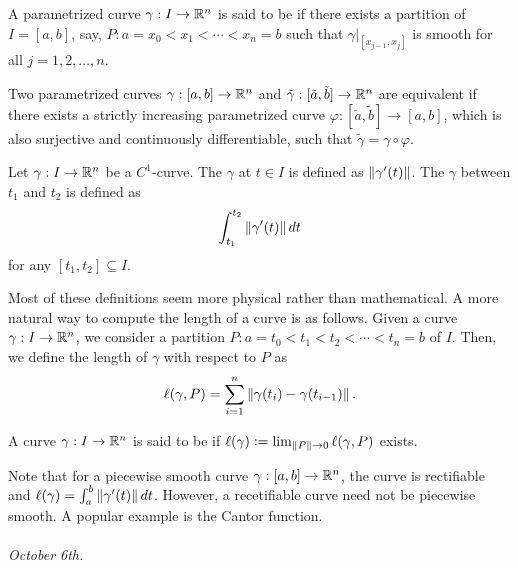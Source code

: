 \begin{definition}
    A parametrized curve $\gamma:I \to \mathbb{R}^{n}$ is said to be  if there exists a partition of $I = [a,b]$, say, $P:a = x_{0}<x_{1}<\cdots<x_{n}=b$ such that $\gamma|_{[x_{j-1},x_{j}]}$ is smooth for all $j = 1,2,\ldots,n$.
\end{definition}

\begin{definition}
    Two parametrized curves $\gamma:[a,b] \to \mathbb{R}^{n}$ and $\tilde{\gamma}:[\tilde{a},\tilde{b}] \to \mathbb{R}^{n}$ are equivalent if there exists a strictly increasing parametrized curve $\varphi:[\tilde{a},\tilde{b}] \to [a,b]$, which is also surjective and continuously differentiable, such that $\tilde{\gamma} = \gamma \circ \varphi$.
\end{definition}

\begin{definition}
    Let $\gamma:I \to \mathbb{R}^{n}$ be a $C^{1}$-curve. The  $\gamma$ at $t \in I$ is defined as $\left\lVert\gamma'(t)\right\rVert$. The  $\gamma$ between $t_{1}$ and $t_{2}$ is defined as
    \begin{align}
        \int_{t_{1}}^{t_{2}} \left\lVert\gamma'(t)\right\rVert dt
    \end{align}
    for any $[t_{1},t_{2}] \subseteq I$.
\end{definition}

Most of these definitions seem more physical rather than mathematical. A more natural way to compute the length of a curve is as follows. Given a curve $\gamma:I \to \mathbb{R}^{n}$, we consider a partition $P:a=t_{0} < t_{1} < t_{2} < \cdots < t_{n} = b$ of $I$. Then, we define the length of $\gamma$ with respect to $P$ as
\begin{align}
    \ell(\gamma,P) = \sum_{i=1}^{n} \left\lVert\gamma(t_{i})-\gamma(t_{i-1})\right\rVert.
\end{align}

\begin{definition}
    A curve $\gamma:I \to \mathbb{R}^{n}$ is said to be  if $\ell(\gamma) \vcentcolon= \lim_{\left\lVert P\right\rVert \to 0} \ell(\gamma,P)$ exists.
\end{definition}

Note that for a piecewise smooth curve $\gamma:[a,b] \to \mathbb{R}^{n}$, the curve is rectifiable and $\ell(\gamma) = \int_{a}^{b} \left\lVert\gamma'(t)\right\rVert dt$. However, a recetifiable curve need not be piecewise smooth. A popular example is the Cantor function.\\ \\
\textit{October 6th.}

